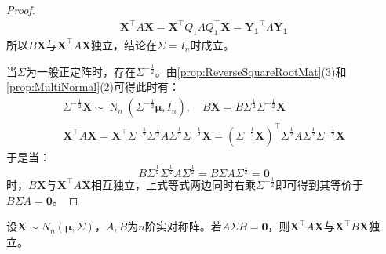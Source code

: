 \begin{proof}
\begin{gather*}
		\mathbf{X}^{\top}A\mathbf{X}=\mathbf{X}^{\top}Q_1\varLambda Q_1^{\top}\mathbf{X}=\mathbf{Y_1}^{\top}\varLambda\mathbf{Y_1}
	\end{gather*}
	所以$B\mathbf{X}$与$\mathbf{X}^{\top}A\mathbf{X}$独立，结论在$\Sigma=I_n$时成立。\par
	当$\Sigma$为一般正定阵时，存在$\Sigma^{-\frac{1}{2}}$。由\cref{prop:ReverseSquareRootMat}(3)和\cref{prop:MultiNormal}(2)可得此时有：
	\begin{gather*}
		\Sigma^{-\frac{1}{2}}\mathbf{X}\sim\operatorname{N}_n(\Sigma^{-\frac{1}{2}}\boldsymbol{\mu},I_n),\quad B\mathbf{X}=B\Sigma^{\frac{1}{2}}\Sigma^{-\frac{1}{2}}\mathbf{X} \\
		\mathbf{X}^{\top}A\mathbf{X}=\mathbf{X}^{\top}\Sigma^{-\frac{1}{2}}\Sigma^{\frac{1}{2}}A\Sigma^{\frac{1}{2}}\Sigma^{-\frac{1}{2}}\mathbf{X}=(\Sigma^{-\frac{1}{2}}\mathbf{X})^{\top}\Sigma^{\frac{1}{2}}A\Sigma^{\frac{1}{2}}\Sigma^{-\frac{1}{2}}\mathbf{X}
	\end{gather*}
	于是当：
	\begin{equation*}
		B\Sigma^{\frac{1}{2}}\Sigma^{\frac{1}{2}}A\Sigma^{\frac{1}{2}}=B\Sigma A\Sigma^{\frac{1}{2}}=\mathbf{0}
	\end{equation*}
	时，$B\mathbf{X}$与$\mathbf{X}^{\top}A\mathbf{X}$相互独立，上式等式两边同时右乘$\Sigma^{-\frac{1}{2}}$即可得到其等价于$B\Sigma A=\mathbf{0}$。
\end{proof}
\begin{theorem}\label{theo:XAXXBXIndependent}
	设$\mathbf{X}\sim N_n(\boldsymbol{\mu},\Sigma)$，$A,B$为$n$阶实对称阵。若$A\Sigma B=\mathbf{0}$，则$\mathbf{X}^{\top}A\mathbf{X}$与$\mathbf{X}^{\top}B\mathbf{X}$独立。
\end{theorem}

